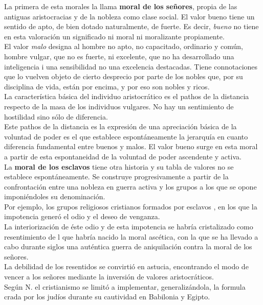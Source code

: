 \documentclass[a4paper, 10pt, twocolumn, spanish]{article}
\begin{document}
La primera de esta morales la llama \textbf{moral de los señores}, propia de
las antiguas aristocracias y de la nobleza como clase social. El valor
bueno tiene un sentido de apto, de bien dotado naturalmente, de
fuerte. Es decir, \emph{bueno} no tiene en esta valoración un significado
ni moral ni moralizante propiamente.\\[0pt]
El valor \emph{malo} designa al hombre no apto, no capacitado, ordinario y
común, hombre vulgar, que no es fuerte, ni excelente, que no ha
desarrollado una inteligencia i una sensibilidad no una excelencia
destacadas. Tiene connotaciones que lo vuelven objeto de cierto
desprecio por parte de los nobles que, por su disciplina de vida,
están por encima, y por eso son nobles y ricos.\\[0pt]

La característica básica del individuo aristocrático es el pathos de
la distancia respecto de la masa de los individuos vulgares. No hay un
sentimiento de hostilidad sino sólo de diferencia.\\[0pt]
Este pathos de la distancia es la expresión de una apreciación básica
de la voluntad de poder es el que establece espontáneamente la
jerarquía en cuanto diferencia fundamental entre buenos y malos. El
valor bueno surge en esta moral a partir de esta espontaneidad de la
voluntad de poder ascendente y activa.\\[0pt]

La \textbf{moral de los esclavos} tiene otra historia y su tabla de valores
no se establece espontáneamente. Se construye progresivamente a partir
de la confrontación entre una nobleza en guerra activa y los grupos a
los que se opone imponiéndoles su denominación.\\[0pt]
Por ejemplo, los grupos religiosos cristianos formados por esclavos ,
en los que la impotencia generó el odio y el deseo de venganza.\\[0pt]
La interiorización de éste odio y de esta impotencia se habría
cristalizado como resentimiento de l que habría nacido la moral
ascética, con la que se ha llevado a cabo durante siglos una auténtica
guerra de aniquilación contra la moral de los señores.\\[0pt]
La debilidad de los resentidos se convirtió en astucia, encontrando el
modo de vencer a los señores mediante la inversión de valores
aristocráticos.\\[0pt]
Según N. el cristianismo se limitó a implementar, generalizándola, la
formula crada por los judíos durante su cautividad en Babilonia y
Egipto.\\[0pt]
\end{document}
